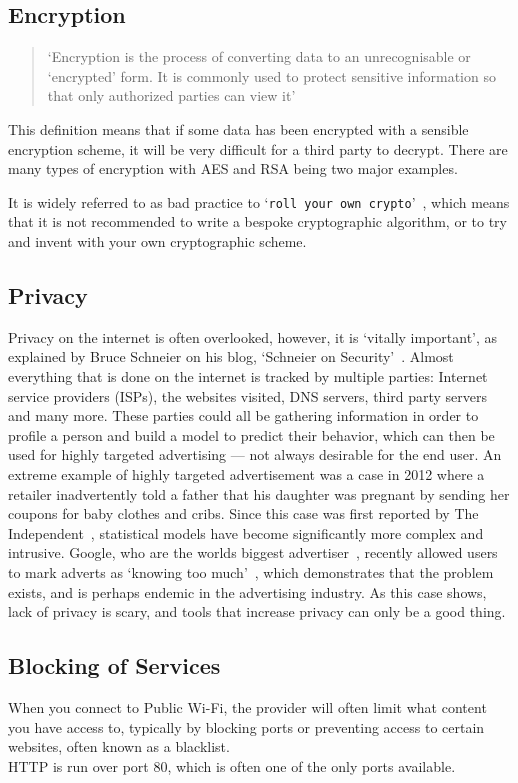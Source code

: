 \subsection{Encryption}
\begin{quotation}
    `Encryption is the process of converting data to an unrecognisable or
    `encrypted' form. It is commonly used to protect sensitive
    information so that only authorized parties can view it'~\cite{dictenc}
\end{quotation}
This definition means that if some data has been encrypted with a sensible encryption scheme, it will be very difficult for a third party to decrypt.
There are many types of encryption with AES and RSA being two major examples.\par
It is widely referred to as bad practice to `\texttt{roll your own crypto}'~\cite{memtocrypto}, which means that it is not recommended to write a bespoke cryptographic algorithm, or to try and invent with your own cryptographic scheme.

\subsection{Privacy}
Privacy on the internet is often overlooked, however, it is `vitally important', as explained by Bruce Schneier on his blog, `Schneier on Security'~\cite{privacyrulez}. Almost everything that is done on the internet is tracked by multiple parties: Internet service providers (ISPs), the websites visited, DNS servers, third party servers and many more. These parties could all be gathering information in order to profile a person and build a model to predict their behavior, which can then be used for highly targeted advertising --- not always desirable for the end user. An extreme example of highly targeted advertisement was a case in 2012 where a retailer inadvertently told a father that his daughter was pregnant by sending her coupons for baby clothes and cribs.
Since this case was first reported by The Independent~\cite{babyshower}, statistical models have become significantly more complex and intrusive. Google, who are the worlds biggest advertiser~\cite{biggoogle}, recently allowed users to mark adverts as `knowing too much'~\cite{googlearewatching}, which demonstrates that the problem exists, and is perhaps endemic in the advertising industry.
As this case shows, lack of privacy is scary, and tools that increase privacy can only be a good thing.

\subsection{Blocking of Services}
When you connect to Public Wi-Fi, the provider will often limit what content you have access to, typically by blocking ports or preventing access to certain websites, often known as a blacklist.\\
HTTP is run over port 80, which is often one of the only ports available.

